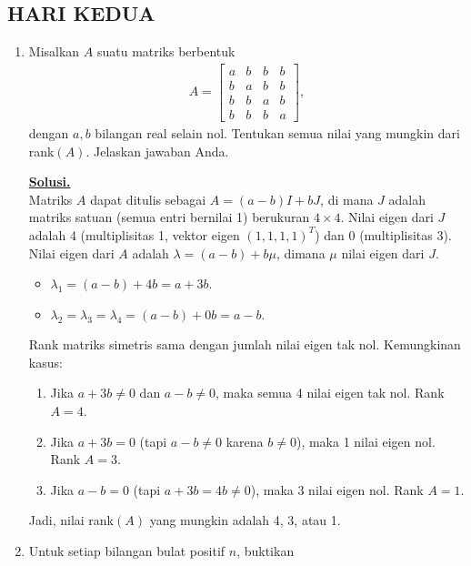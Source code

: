 \documentclass[12pt,twoside]{article}
\newenvironment{solution}
{
	\par\noindent\textbf{\underline{Solusi.}}\\
}
{
	\par
}
\begin{document}
\subsection{HARI KEDUA}
\begin{enumerate}
  \item Misalkan $A$ suatu matriks berbentuk
        \begin{align*}
          A=\begin{bmatrix}
              a & b & b & b \\
              b & a & b & b \\
              b & b & a & b \\
              b & b & b & a
            \end{bmatrix},
        \end{align*}
        dengan $a,b$ bilangan real selain nol. Tentukan semua nilai yang mungkin dari rank$(A)$. Jelaskan jawaban Anda.
        \begin{solution}
          Matriks $A$ dapat ditulis sebagai $A = (a-b)I + bJ$, di mana $J$ adalah matriks satuan (semua entri bernilai 1) berukuran $4 \times 4$.
          Nilai eigen dari $J$ adalah 4 (multiplisitas 1, vektor eigen $(1,1,1,1)^T$) dan 0 (multiplisitas 3).
          Nilai eigen dari $A$ adalah $\lambda = (a-b) + b \mu$, dimana $\mu$ nilai eigen dari $J$.
          \begin{itemize}
            \item $\lambda_1 = (a-b) + 4b = a+3b$.
            \item $\lambda_2 = \lambda_3 = \lambda_4 = (a-b) + 0b = a-b$.
          \end{itemize}
          Rank matriks simetris sama dengan jumlah nilai eigen tak nol.
          Kemungkinan kasus:
          \begin{enumerate}
            \item Jika $a+3b \neq 0$ dan $a-b \neq 0$, maka semua 4 nilai eigen tak nol. Rank $A = 4$.
            \item Jika $a+3b = 0$ (tapi $a-b \neq 0$ karena $b \neq 0$), maka 1 nilai eigen nol. Rank $A = 3$.
            \item Jika $a-b = 0$ (tapi $a+3b = 4b \neq 0$), maka 3 nilai eigen nol. Rank $A = 1$.
          \end{enumerate}
          Jadi, nilai rank$(A)$ yang mungkin adalah 4, 3, atau 1.
        \end{solution}
  \item Untuk setiap bilangan bulat positif $n$, buktikan
        \begin{align*}

\end{align*}
\end{enumerate}
\end{document}
